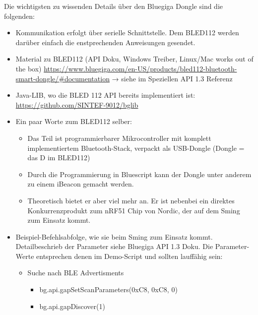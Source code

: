 Die wichtigsten zu wissenden Details über den Bluegiga Dongle sind die folgenden:

\begin{itemize}
\itemsep 1pt \parskip 0pt \parsep 0pt
\item Kommunikation erfolgt über serielle Schnittstelle. Dem BLED112 werden darüber einfach die enstprechenden Anweisungen gesendet.

\item Material zu BLED112 (API Doku, Windows Treiber, Linux/Mac works out of the box) \url{https://www.bluegiga.com/en-US/products/bled112-bluetooth-smart-dongle/#documentation} → siehe im Speziellen API 1.3 Referenz


\item Java-LIB, wo die BLED 112 API bereits implementiert ist: \url{https://github.com/SINTEF-9012/bglib}


\item Ein paar Worte zum BLED112 selber:
	\begin{itemize}
	\itemsep 1pt \parskip 0pt \parsep 0pt
	\item  Das Teil ist programmierbarer Mikrocontroller mit komplett implementiertem Bluetooth-Stack, verpackt als USB-Dongle (Dongle = das D im BLED112)

	\item  Durch die Programmierung in Bluescript kann der Dongle unter anderem zu einem iBeacon gemacht werden.


	\item  Theoretisch bietet er aber viel mehr an. Er ist nebenbei ein direktes Konkurrenzprodukt zum nRF51 Chip von Nordic, der auf dem Sming zum Einsatz kommt.
	\end{itemize}


\item Beispiel-Befehlsabfolge, wie sie beim Sming zum Einsatz kommt. Detailbeschrieb der Parameter siehe Bluegiga API 1.3 Doku. Die Parameter-Werte entsprechen denen im Demo-Script und sollten lauffähig sein:

	\begin{itemize}
	\itemsep 1pt \parskip 0pt \parsep 0pt
	\item Suche nach BLE Advertisments
		\begin{itemize}
			\itemsep 1pt \parskip 0pt \parsep 0pt
			\item bg.api.gapSetScanParameters(0xC8, 0xC8, 0)
			\item bg.api.gapDiscover(1)
		\end{itemize}


\end{itemize}
\end{itemize}
